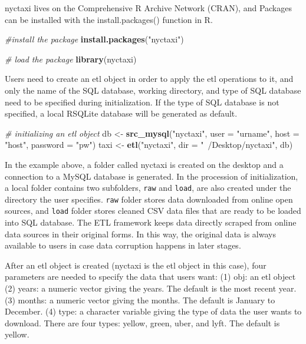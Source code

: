 \documentclass[12pt,twoside]{reedthesis}
\newenvironment{Shaded}{\begin{snugshade}}{\end{snugshade}}
\newcommand{\KeywordTok}[1]{\textcolor[rgb]{0.13,0.29,0.53}{\textbf{#1}}}
\newcommand{\DataTypeTok}[1]{\textcolor[rgb]{0.13,0.29,0.53}{#1}}
\newcommand{\StringTok}[1]{\textcolor[rgb]{0.31,0.60,0.02}{#1}}
\newcommand{\CommentTok}[1]{\textcolor[rgb]{0.56,0.35,0.01}{\textit{#1}}}
\newcommand{\NormalTok}[1]{#1}
\theoremstyle{definition}
\theoremstyle{definition}
\theoremstyle{definition}
\theoremstyle{remark}
\begin{document}
nyctaxi lives on the Comprehensive R Archive Network (CRAN), and
Packages can be installed with the install.packages() function in R.
\begin{Shaded}
\begin{Highlighting}[]
\CommentTok{#install the package}
\KeywordTok{install.packages}\NormalTok{(}\StringTok{"nyctaxi"}\NormalTok{)}

\CommentTok{# load the package}
\KeywordTok{library}\NormalTok{(nyctaxi)}
\end{Highlighting}
\end{Shaded}
Users need to create an etl object in order to apply the etl operations
to it, and only the name of the SQL database, working directory, and
type of SQL database need to be specified during initialization. If the
type of SQL database is not specified, a local RSQLite database will be
generated as default.
\begin{Shaded}
\begin{Highlighting}[]
\CommentTok{# initializing an etl object}
\NormalTok{db <-}\StringTok{ }\KeywordTok{src_mysql}\NormalTok{(}\StringTok{"nyctaxi"}\NormalTok{, }\DataTypeTok{user =} \StringTok{"urname"}\NormalTok{, }\DataTypeTok{host =} \StringTok{"host"}\NormalTok{, }\DataTypeTok{password =} \StringTok{"pw"}\NormalTok{)}
\NormalTok{taxi <-}\StringTok{ }\KeywordTok{etl}\NormalTok{(}\StringTok{"nyctaxi"}\NormalTok{, }\DataTypeTok{dir =} \StringTok{"~/Desktop/nyctaxi"}\NormalTok{, db)}
\end{Highlighting}
\end{Shaded}
In the example above, a folder called nyctaxi is created on the desktop
and a connection to a MySQL database is generated. In the procession of
initialization, a local folder contains two subfolders, \texttt{raw} and
\texttt{load}, are also created under the directory the user specifies.
\texttt{raw} folder stores data downloaded from online open sources, and
\texttt{load} folder stores cleaned CSV data files that are ready to be
loaded into SQL database. The ETL framework keeps data directly scraped
from online data sources in their original forms. In this way, the
original data is always available to users in case data corruption
happens in later stages.

After an etl object is created (nyctaxi is the etl object in this case),
four parameters are needed to specify the data that users want: (1) obj:
an etl object (2) years: a numeric vector giving the years. The default
is the most recent year. (3) months: a numeric vector giving the months.
The default is January to December. (4) type: a character variable
giving the type of data the user wants to download. There are four
types: yellow, green, uber, and lyft. The default is yellow.
\end{document}
